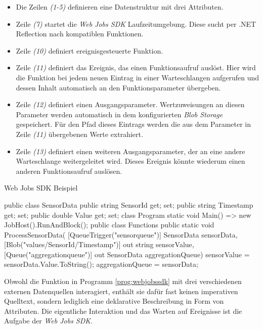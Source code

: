 \begin{itemize}
	\item Die Zeilen \textit{(1-5)} definieren eine Datenstruktur mit drei Attributen.
	\item Zeile \textit{(7)} startet die \textit{Web Jobs SDK} Laufzeitumgebung. Diese sucht per .NET Reflection nach kompatiblen Funktionen.
	\item Zeile \textit{(10)} definiert ereignisgesteuerte Funktion.
	\item Zeile \textit{(11)} definiert das Ereignis, das einen Funktionsaufruf auslöst. Hier wird die Funktion bei jedem neuen Eintrag in einer Warteschlangen aufgerufen und dessen Inhalt automatisch an den Funktionsparameter übergeben.
	\item Zeile \textit{(12)} definiert einen Ausgangsparameter. Wertzuweisungen an diesen Parameter werden automatisch in dem konfigurierten \textit{Blob Storage} gespeichert. Für den Pfad dieses Eintrags werden die aus dem Parameter in Zeile \textit{(11)} übergebenen Werte extrahiert.
	\item Zeile \textit{(13)} definiert einen weiteren Ausgangsparameter, der an eine andere Warteschlange weitergeleitet wird. Dieses Ereignis könnte wiederum einen anderen Funktionsaufruf auslösen. 
\end{itemize}

\begin{program}[!hbt]
\caption{Web Jobs SDK Beispiel}
\label{prog:webjobssdk}
\begin{CsCode}
public class SensorData {
  public string SensorId { get; set; }
  public string Timestamp { get; set; }
  public double Value { get; set; }
}
class Program {
  static void Main() => new JobHost().RunAndBlock();
}
public class Functions {
  public static void ProcessSensorData(
    [QueueTrigger("sensorqueue")] SensorData sensorData,
    [Blob("values/{SensorId}/{Timestamp}")] out string sensorValue,
    [Queue("aggregationqueue")] out SensorData aggregationQueue) {
    sensorValue = sensorData.Value.ToString();
    aggregationQueue = sensorData;
  }
}
\end{CsCode}
\end{program}

Obwohl die Funktion in Programm \ref{prog:webjobssdk} mit drei verschiedenen externen Datenquellen interagiert, enthält sie dafür fast keinen imperativen Quelltext, sondern lediglich eine deklarative Beschreibung in Form von Attributen. Die eigentliche Interaktion und das Warten auf Ereignisse ist die Aufgabe der \textit{Web Jobs SDK}. 

